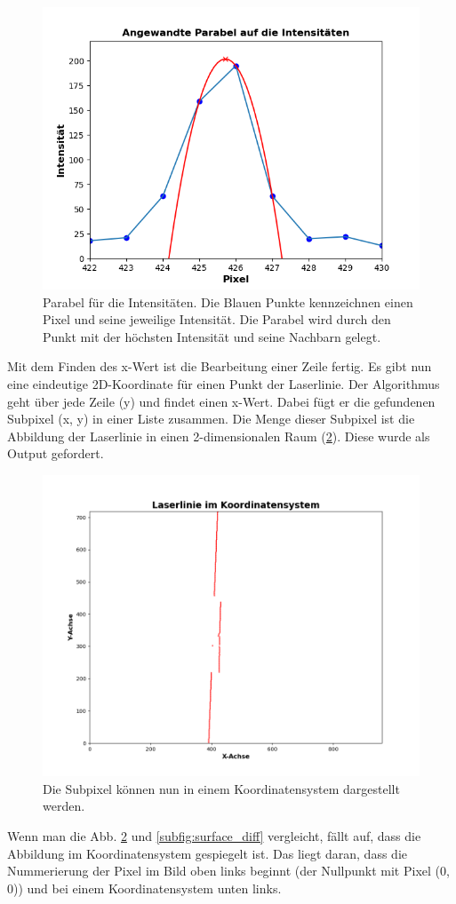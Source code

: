 	\begin{figure}[h]
		\centering
		\includegraphics[width=0.7\linewidth]{img/hauptteil/bildverarbeitung/parable_intensities.png}
		\caption[Parabel für die Intensitäten]{Parabel für die Intensitäten. Die Blauen Punkte kennzeichnen einen Pixel und seine jeweilige Intensität. Die Parabel wird durch den Punkt mit der höchsten Intensität und seine Nachbarn gelegt.}
		\label{fig:parable}
	\end{figure} 
	
	Mit dem Finden des x-Wert ist die Bearbeitung einer Zeile fertig. Es gibt nun eine eindeutige 2D-Koordinate für einen Punkt der Laserlinie. Der Algorithmus geht über jede Zeile (y) und findet einen x-Wert. Dabei fügt er die gefundenen Subpixel (x, y) in einer Liste zusammen. Die Menge dieser Subpixel ist die Abbildung der Laserlinie in einen 2-dimensionalen Raum (\ref{fig:pix_koord}). Diese wurde als Output gefordert.
	
	\begin{figure}[h]
		\centering
		\includegraphics[width=0.8\linewidth]{img/hauptteil/bildverarbeitung/pixel_koord.png}
		\caption[Subpixel im Koordinatensystem]{Die Subpixel können nun in einem Koordinatensystem dargestellt werden.}
		\label{fig:pix_koord}
	\end{figure} 

	Wenn man die Abb. \ref{fig:pix_koord} und \ref{subfig:surface_diff} vergleicht, fällt auf, dass die Abbildung im Koordinatensystem gespiegelt ist. Das liegt daran, dass die Nummerierung der Pixel im Bild oben links beginnt (der Nullpunkt mit Pixel (0, 0)) und bei einem Koordinatensystem unten links. 

	\label{chap:erkennen_der_laserlinie}

